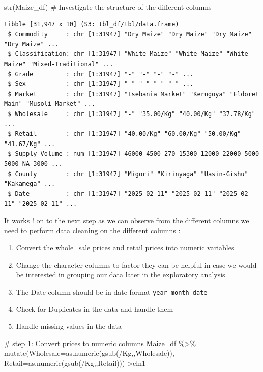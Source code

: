 \documentclass[
  letterpaper,
  DIV=11,
  numbers=noendperiod]{scrartcl}
\newenvironment{Shaded}{\begin{snugshade}}{\end{snugshade}}
\newcommand{\AttributeTok}[1]{\textcolor[rgb]{0.40,0.45,0.13}{#1}}
\newcommand{\CommentTok}[1]{\textcolor[rgb]{0.37,0.37,0.37}{#1}}
\newcommand{\FunctionTok}[1]{\textcolor[rgb]{0.28,0.35,0.67}{#1}}
\newcommand{\NormalTok}[1]{\textcolor[rgb]{0.00,0.23,0.31}{#1}}
\newcommand{\OtherTok}[1]{\textcolor[rgb]{0.00,0.23,0.31}{#1}}
\newcommand{\SpecialCharTok}[1]{\textcolor[rgb]{0.37,0.37,0.37}{#1}}
\newcommand{\StringTok}[1]{\textcolor[rgb]{0.13,0.47,0.30}{#1}}
\begin{document}
\begin{Shaded}
\begin{Highlighting}[]
\FunctionTok{str}\NormalTok{(Maize\_df) }\CommentTok{\# Investigate the structure of the different columns}
\end{Highlighting}
\end{Shaded}

\begin{verbatim}
tibble [31,947 x 10] (S3: tbl_df/tbl/data.frame)
 $ Commodity     : chr [1:31947] "Dry Maize" "Dry Maize" "Dry Maize" "Dry Maize" ...
 $ Classification: chr [1:31947] "White Maize" "White Maize" "White Maize" "Mixed-Traditional" ...
 $ Grade         : chr [1:31947] "-" "-" "-" "-" ...
 $ Sex           : chr [1:31947] "-" "-" "-" "-" ...
 $ Market        : chr [1:31947] "Isebania Market" "Kerugoya" "Eldoret Main" "Musoli Market" ...
 $ Wholesale     : chr [1:31947] "-" "35.00/Kg" "40.00/Kg" "37.78/Kg" ...
 $ Retail        : chr [1:31947] "40.00/Kg" "60.00/Kg" "50.00/Kg" "41.67/Kg" ...
 $ Supply Volume : num [1:31947] 46000 4500 270 15300 12000 22000 5000 5000 NA 3000 ...
 $ County        : chr [1:31947] "Migori" "Kirinyaga" "Uasin-Gishu" "Kakamega" ...
 $ Date          : chr [1:31947] "2025-02-11" "2025-02-11" "2025-02-11" "2025-02-11" ...
\end{verbatim}

It works ! on to the next step as we can observe from the different
columns we need to perform data cleaning on the different columns :

\begin{enumerate}
\def\labelenumi{\arabic{enumi}.}
\item
  Convert the whole\_sale prices and retail prices into numeric
  variables
\item
  Change the character columns to factor they can be helpful in case we
  would be interested in grouping our data later in the exploratory
  analysis
\item
  The Date column should be in date format \texttt{year-month-date}
\item
  Check for Duplicates in the data and handle them
\item
  Handle missing values in the data
\end{enumerate}

\begin{Shaded}
\begin{Highlighting}[]
\CommentTok{\# step 1: Convert prices to numeric columns}
\NormalTok{Maize\_df }\SpecialCharTok{\%\textgreater{}\%}  \FunctionTok{mutate}\NormalTok{(}\AttributeTok{Wholesale=}\FunctionTok{as.numeric}\NormalTok{(}\FunctionTok{gsub}\NormalTok{(}\StringTok{\textquotesingle{}/Kg\textquotesingle{}}\NormalTok{,}\StringTok{\textquotesingle{}\textquotesingle{}}\NormalTok{,Wholesale)),}
                     \AttributeTok{Retail=}\FunctionTok{as.numeric}\NormalTok{(}\FunctionTok{gsub}\NormalTok{(}\StringTok{\textquotesingle{}/Kg\textquotesingle{}}\NormalTok{,}\StringTok{\textquotesingle{}\textquotesingle{}}\NormalTok{,Retail)))}\OtherTok{{-}\textgreater{}}\NormalTok{cln1}
\end{Highlighting}
\end{Shaded}
\end{document}
